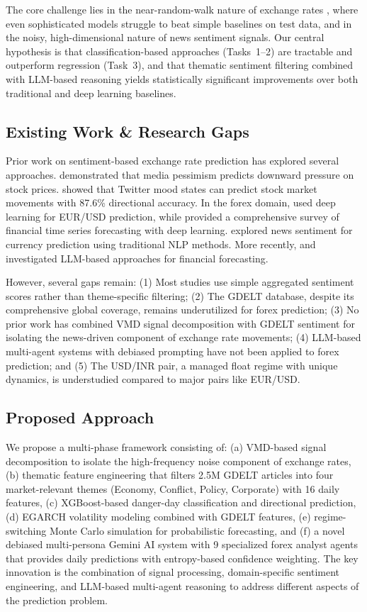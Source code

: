 \documentclass[11pt]{article}
\begin{document}
The core challenge lies in the near-random-walk nature of exchange rates \citep{meese1983}, where even sophisticated models struggle to beat simple baselines on test data, and in the noisy, high-dimensional nature of news sentiment signals. Our central hypothesis is that classification-based approaches (Tasks~1--2) are tractable and outperform regression (Task~3), and that thematic sentiment filtering combined with LLM-based reasoning yields statistically significant improvements over both traditional and deep learning baselines.

\subsection{Existing Work \& Research Gaps}

Prior work on sentiment-based exchange rate prediction has explored several approaches. \citet{tetlock2007} demonstrated that media pessimism predicts downward pressure on stock prices. \citet{bollen2011} showed that Twitter mood states can predict stock market movements with 87.6\% directional accuracy. In the forex domain, \citet{galeshchuk2016} used deep learning for EUR/USD prediction, while \citet{sezer2020} provided a comprehensive survey of financial time series forecasting with deep learning. \citet{wu2020sentiment} explored news sentiment for currency prediction using traditional NLP methods. More recently, \citet{xie2023} and \citet{li2024llm} investigated LLM-based approaches for financial forecasting.

However, several gaps remain: (1) Most studies use simple aggregated sentiment scores rather than theme-specific filtering; (2) The GDELT database, despite its comprehensive global coverage, remains underutilized for forex prediction; (3) No prior work has combined VMD signal decomposition with GDELT sentiment for isolating the news-driven component of exchange rate movements; (4) LLM-based multi-agent systems with debiased prompting have not been applied to forex prediction; and (5) The USD/INR pair, a managed float regime with unique dynamics, is understudied compared to major pairs like EUR/USD.

\subsection{Proposed Approach}

We propose a multi-phase framework consisting of: (a) VMD-based signal decomposition to isolate the high-frequency noise component of exchange rates, (b) thematic feature engineering that filters 2.5M GDELT articles into four market-relevant themes (Economy, Conflict, Policy, Corporate) with 16 daily features, (c) XGBoost-based danger-day classification and directional prediction, (d) EGARCH volatility modeling combined with GDELT features, (e) regime-switching Monte Carlo simulation for probabilistic forecasting, and (f) a novel debiased multi-persona Gemini AI system with 9 specialized forex analyst agents that provides daily predictions with entropy-based confidence weighting. The key innovation is the combination of signal processing, domain-specific sentiment engineering, and LLM-based multi-agent reasoning to address different aspects of the prediction problem.
\end{document}
